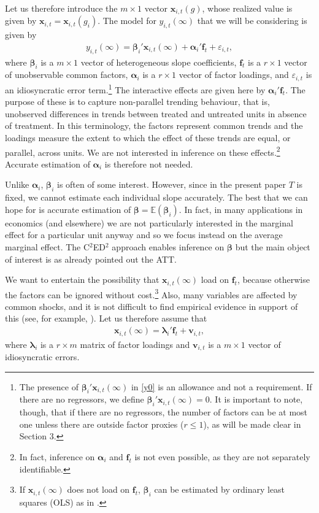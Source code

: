 \documentclass[12pt,fleqn]{article}
\def\*#1{\mathbf{#1}}
\def\+#1{\boldsymbol{#1}}
\begin{document}
Let us therefore introduce the $m\times 1$ vector $\*x_{i,t}(g)$, whose realized value is given by $\*x_{i,t} = \*x_{i,t}(g_i)$. The model for $y_{i,t}(\infty)$ that we will be considering is given by
\begin{align}
y_{i,t}(\infty) = \+\beta_i'\*x_{i,t}(\infty) +  \+\alpha_i'\*f_t + \varepsilon_{i,t},\label{y0}
\end{align}
where $\+\beta_i$ is a $m\times 1$ vector of heterogeneous slope coefficients, $\*f_t$ is a $r \times 1$ vector of unobservable common factors, $\+\alpha_i$ is a $r\times 1$ vector of factor loadings, and $\varepsilon_{i,t}$ is an idiosyncratic error term.\footnote{The presence of $\+\beta_i'\*x_{i,t}(\infty)$ in \eqref{y0} is an allowance and not a requirement. If there are no regressors, we define $\+\beta_i'\*x_{i,t}(\infty) = 0$. It is important to note, though, that if there are no regressors, the number of factors can be at most one unless there are outside factor proxies ($r \leq 1$), as will be made clear in Section 3.} The interactive effects are given here by $\+\alpha_i'\*f_t$. The purpose of these is to capture non-parallel trending behaviour, that is, unobserved differences in trends between treated and untreated units in absence of treatment. In this terminology, the factors represent common trends and the loadings measure the extent to which the effect of these trends are equal, or parallel, across units. We are not interested in inference on these effects.\footnote{In fact, inference on $\+\alpha_i$ and $\*f_t$ is not even possible, as they are not separately identifiable.} Accurate estimation of $\+\alpha_i$ is therefore not needed.

Unlike $\+\alpha_i$, $\+\beta_i$ is often of some interest. However, since in the present paper $T$ is fixed, we cannot estimate each individual slope accurately. The best that we can hope for is accurate estimation of $\+\beta = \mathbb{E}(\+\beta_i)$. In fact, in many applications in economics (and elsewhere) we are not particularly interested in the marginal effect for a particular unit anyway and so we focus instead on the average marginal effect. The C$^2$ED$^2$ approach enables inference on $\+\beta$ but the main object of interest is as already pointed out the ATT. 

We want to entertain the possibility that $\*x_{i,t}(\infty)$ load on $\*f_t$, because otherwise the factors can be ignored without cost.\footnote{If $\*x_{i,t}(\infty)$ does not load on $\*f_{t}$, $\+\beta_i$ can be estimated by ordinary least squares (OLS) as in \citet{Wooldridge_2005}.} Also, many variables are affected by common shocks, and it is not difficult to find empirical evidence in support of this (see, for example, \citealp{westerlund2019cce}). Let us therefore assume that
\begin{align}
\*x_{i,t}(\infty) = \+\lambda_i'\*f_t + \*v_{i,t}, \label{x}
\end{align}
where $\+\lambda_i$ is a $r \times m$ matrix of factor loadings and $\*v_{i,t}$ is a $m \times 1$ vector of idiosyncratic errors.
\end{document}
